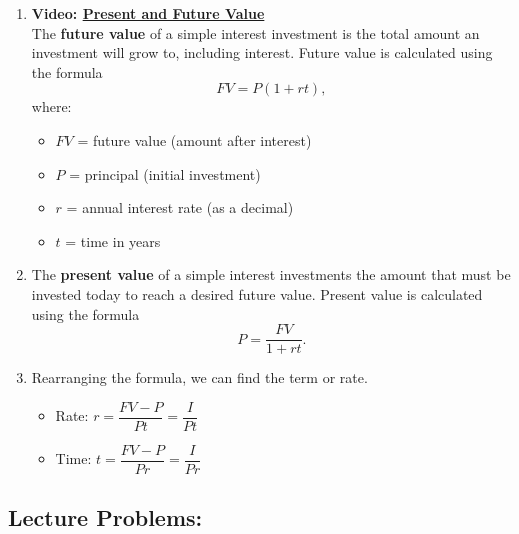 \documentclass[
]{book}
\providecommand{\tightlist}{%
  \setlength{\itemsep}{0pt}\setlength{\parskip}{0pt}}
\begin{document}
\begin{enumerate}
\def\labelenumi{\arabic{enumi}.}
\tightlist
\item
  \textbf{Video: \href{https://youtu.be/rO37XyVQjW8}{Present and Future Value}}\\
  The \textbf{future value} of a simple interest investment is the total amount an investment will grow to, including interest. Future value is calculated using the formula \[FV = P(1 + rt),\] where:

  \begin{itemize}
  \tightlist
  \item
    \(FV\) = future value (amount after interest)
  \item
    \(P\) = principal (initial investment)
  \item
    \(r\) = annual interest rate (as a decimal)
  \item
    \(t\) = time in years
  \end{itemize}
\item
  The \textbf{present value} of a simple interest investments the amount that must be invested today to reach a desired future value. Present value is calculated using the formula \[ P = \frac{FV}{1 + rt}.\]
\item
  Rearranging the formula, we can find the term or rate.

  \begin{itemize}
  \tightlist
  \item
    Rate: \(r = \dfrac{FV - P}{Pt} = \dfrac{I}{Pt}\)
  \item
    Time: \(t = \dfrac{FV - P}{Pr} = \dfrac{I}{Pr}\)
  \end{itemize}
\end{enumerate}

\subsection*{Lecture Problems:}\label{lecture-problems-7}
\end{document}
